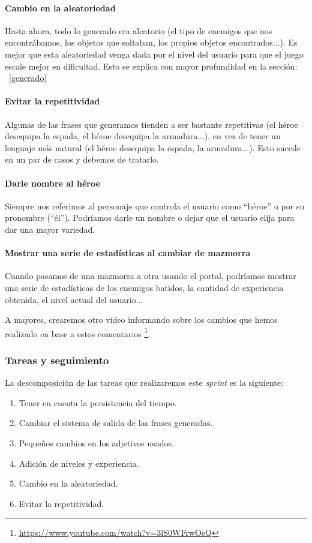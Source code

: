 \paragraph{Cambio en la aleatoriedad} Hasta ahora, todo lo generado era aleatorio (el tipo de enemigos que nos encontrábamos, los objetos que soltaban, los propios objetos encontrados...). Es mejor que esta aleatoriedad venga dada por el nivel del usuario para que el juego escale mejor en dificultad. Esto se explica con mayor profundidad en la sección: ~\ref{generado}

\paragraph{Evitar la repetitividad} Algunas de las frases que generamos tienden a ser bastante repetitivas (el héroe desequipa la espada, el héroe desequipa la armadura...), en vez de tener un lenguaje más natural (el héroe desequipa la espada, la armadura...). Esto sucede en un par de casos y debemos de tratarlo.

\paragraph{Darle nombre al héroe} Siempre nos referimos al personaje que controla el usuario como ``héroe'' o por su pronombre (``él''). Podríamos darle un nombre o dejar que el usuario elija para dar una mayor variedad.

\paragraph{Mostrar una serie de estadísticas al cambiar de mazmorra} Cuando pasamos de una mazmorra a otra usando el portal, podríamos mostrar una serie de estadísticas de los enemigos batidos, la cantidad de experiencia obtenida, el nivel actual del usuario...

A mayores, crearemos otro vídeo informando sobre los cambios que hemos realizado en base a estos comentarios \footnote{\url{https://www.youtube.com/watch?v=3lS0WFrwOeQ}}.

\subsubsection{Tareas y seguimiento}

La descomposición de las tareas que realizaremos este \textit{sprint} es la siguiente:

\begin{enumerate}[label=\bfseries WBS 8.\arabic*]
  \item Tener en cuenta la persistencia del tiempo.
  \item Cambiar el sistema de salida de las frases generadas.
  \item Pequeños cambios en los adjetivos usados.
  \item Adición de niveles y experiencia.
  \item Cambio en la aleatoriedad.
  \item Evitar la repetitividad.
\end{enumerate}

